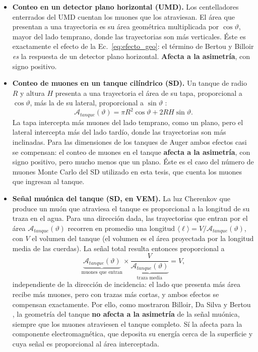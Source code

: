 \begin{itemize}
	\item \textbf{Conteo en un detector plano horizontal (UMD).} Los centelladores enterrados del UMD cuentan los muones que los atraviesan. El área que presentan a una trayectoria es su área geométrica multiplicada por $\cos\vartheta$, mayor del lado temprano, donde las trayectorias son más verticales. Éste es exactamente el efecto de la Ec.~\ref{eq:efecto_geo}: el término de Bertou y Billoir \textit{es} la respuesta de un detector plano horizontal. \textbf{Afecta a la asimetría}, con signo positivo.

	\item \textbf{Conteo de muones en un tanque cilíndrico (SD).} Un tanque de radio $R$ y altura $H$ presenta a una trayectoria el área de su tapa, proporcional a $\cos\vartheta$, más la de su lateral, proporcional a $\sin\vartheta$ \cite{Billoir2002b, Armbruster2018}:
	\begin{equation}
		\mathcal{A}_{tanque}(\vartheta) = \pi R^2\cos\vartheta + 2RH\sin\vartheta .
		\label{eq:area_tanque}
	\end{equation}
	La tapa intercepta más muones del lado temprano, como un plano, pero el lateral intercepta más del lado tardío, donde las trayectorias son más inclinadas. Para las dimensiones de los tanques de Auger ambos efectos casi se compensan: el conteo de muones en el tanque \textbf{afecta a la asimetría}, con signo positivo, pero mucho menos que un plano. Éste es el caso del número de muones Monte Carlo del SD utilizado en esta tesis, que cuenta los muones que ingresan al tanque.

	\item \textbf{Señal muónica del tanque (SD, en VEM).} La luz Cherenkov que produce un muón que atraviesa el tanque es proporcional a la longitud de su traza en el agua. Para una dirección dada, las trayectorias que entran por el área $\mathcal{A}_{tanque}(\vartheta)$ recorren en promedio una longitud $\langle\ell\rangle = V/\mathcal{A}_{tanque}(\vartheta)$, con $V$ el volumen del tanque (el volumen es el área proyectada por la longitud media de las cuerdas). La señal total resulta entonces proporcional a
	\begin{equation}
		\underbrace{\mathcal{A}_{tanque}(\vartheta)}_{\text{muones que entran}} \times \underbrace{\frac{V}{\mathcal{A}_{tanque}(\vartheta)}}_{\text{traza media}} = V ,
		\nonumber
	\end{equation}
	independiente de la dirección de incidencia: el lado que presenta más área recibe más muones, pero con trazas más cortas, y ambos efectos se compensan exactamente. Por ello, como mostraron Billoir, Da Silva y Bertou \cite{Billoir2002b}, la geometría del tanque \textbf{no afecta a la asimetría} de la señal muónica, siempre que los muones atraviesen el tanque completo. Sí la afecta para la componente electromagnética, que deposita su energía cerca de la superficie y cuya señal es proporcional al área interceptada.
\end{itemize}

